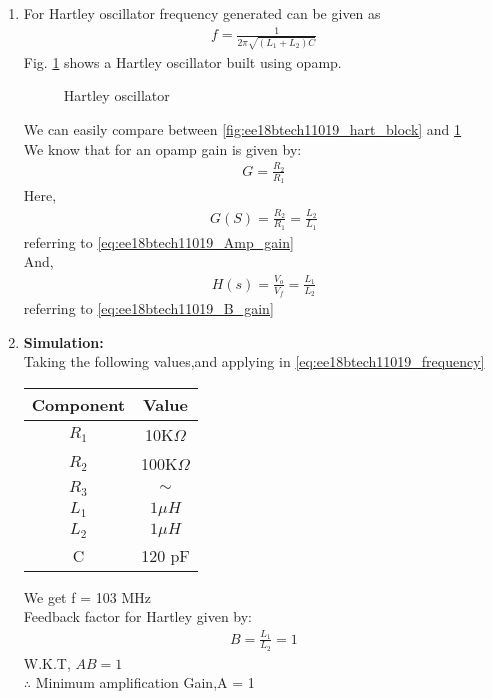 \begin{enumerate}[label=\thesection.\arabic*.,ref=\thesection.\theenumi]
\item For Hartley oscillator frequency generated can be given as 
\begin{align}
    f = \frac{1}{2\pi\sqrt{(L_1 + L_2)C}}
    \label{eq:ee18btech11019_frequency}
\end{align}
Fig. \ref{fig:ee18btech11019_hart} shows a
Hartley oscillator built using opamp.\\

\begin{figure}[ht]
    \begin{center}
	    \resizebox{\columnwidth}{!}{}
	\end{center}
\caption{Hartley oscillator}
\label{fig:ee18btech11019_hart}
\end{figure}
We can easily compare between \ref{fig:ee18btech11019_hart_block} and \ref{fig:ee18btech11019_hart}\\
We know that for an opamp gain is given by:
\begin{align}
    G = \frac{R_2}{R_1}
\end{align}
Here,
\begin{align}
    G(S) = \frac{R_2}{R_1} = \frac{L_2}{L_1}
\end{align}
referring to \ref{eq:ee18btech11019_Amp_gain}\\
And,
\begin{align}
    H(s) = \frac{V_o}{V_f} = \frac{L_1}{L_2}
\end{align}
referring to \ref{eq:ee18btech11019_B_gain}\\
\newline
\item \textbf{Simulation:}\\
Taking the following values,and applying in \ref{eq:ee18btech11019_frequency} \\



\begin{tabular}{|c|c|}
\hline
Component & Value  \\
\hline
$R_1$         & 10K$\Omega$   \\
\hline
$R_2$         & 100K$\Omega$   \\
\hline
$R_3$         & $\sim$  \\
\hline
$L_1$         & $1 \mu H$     \\
\hline
$L_2$         & $1 \mu H$   \\
\hline
C         & 120 pF \\
\hline
\end{tabular}


We get f = 103 MHz\\
Feedback factor for Hartley given by:
\begin{align}
B =\frac{L_1}{L_2}= 1
\end{align}
W.K.T, $AB = 1$\\
$\therefore$ Minimum amplification Gain,A = 1\\
\end{enumerate}
